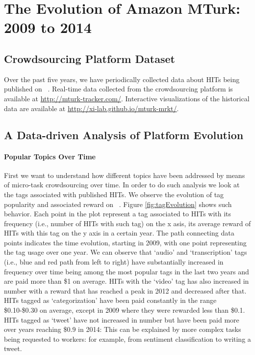 \section{The Evolution of Amazon MTurk: 2009 to 2014}\label{sec:stats}

\subsection{Crowdsourcing Platform Dataset}\label{sec:tracker}
Over the past five years, we have periodically collected data about HITs being published on \amt\ .
Real-time data collected from the crowdsourcing platform is available at \url{http://mturk-tracker.com/}.
Interactive visualizations of the historical data are available at \url{http://xi-lab.github.io/mturk-mrkt/}.


\subsection{A Data-driven Analysis of Platform Evolution}
\paragraph{Popular Topics  Over Time}
First we want to understand how different topics have been addressed by means of micro-task crowdsourcing over time.
In order to do such analysis we look at the tags associated with published HITs. We observe the evolution of tag popularity and associated reward on \amt\ . 
Figure \ref{fig:tagEvolution} shows such behavior. Each point in the plot represent a tag associated to HITs with its frequency (i.e., number of HITs with such tag) on the x asis, its average reward of HITs with this tag on the y axis in a certain year. The path connecting data points indicates the time evolution, starting in 2009, with one point representing the tag usage over one year.
We can observe that `audio' and `transcription' tags (i.e., blue and red path from left to right) have substantially increased in frequency over time being among the most popular tags in the last two years and are paid more than \$1 on average.
HITs with the `video' tag has also increased in number with a reward that has reached a peak in 2012 and decreased after that.
HITs tagged as `categorization' have been paid constantly in the range \$0.10-\$0.30 on average, except in 2009 where they were rewarded less than \$0.1.
HITs tagged as `tweet' have not increased in number but have been paid more over years reaching \$0.9 in 2014: This can be explained by more complex tasks being requested to workers: for example, from sentiment classification to writing a tweet.

